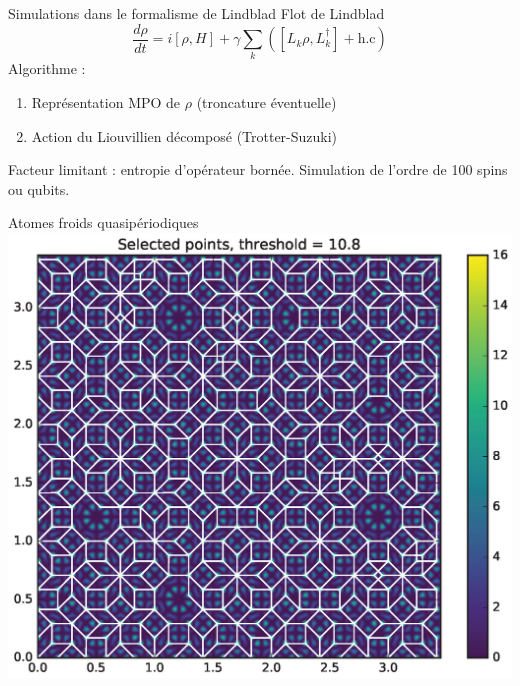 \begin{frame}{Simulations dans le formalisme de Lindblad}
Flot de Lindblad 
\[
	\frac{d \rho}{d t} = i[\rho, H] + \gamma \sum_k\left( [L_k \rho, L_k^\dagger] + \text{h.c} \right)
\]
Algorithme : 
\begin{enumerate}
	\item Représentation MPO de $\rho$ (troncature éventuelle)
	\item Action du Liouvillien décomposé (Trotter-Suzuki)
\end{enumerate}
Facteur limitant : entropie d'opérateur bornée. Simulation de l'ordre de 100 spins ou qubits.
\end{frame}

\begin{frame}{Atomes froids quasipériodiques}
\centering
\includegraphics[width=0.5\columnwidth]{img/4_questions/cold_atoms_qc}
\end{frame}

